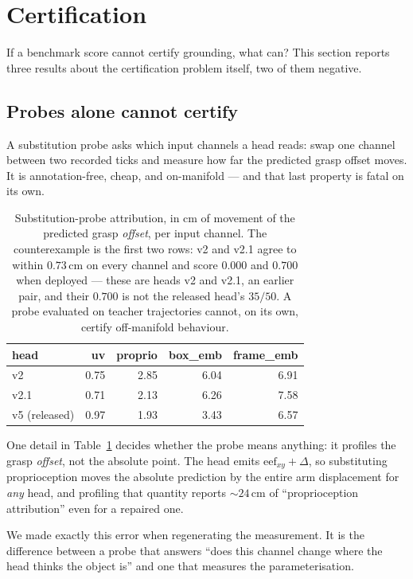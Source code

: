 \documentclass[10pt,twocolumn]{article}
\begin{document}
\section{Certification}
\label{sec:cert}

If a benchmark score cannot certify grounding, what can? This section reports
three results about the certification problem itself, two of them negative.

\subsection{Probes alone cannot certify}

A substitution probe asks which input channels a head reads: swap one channel
between two recorded ticks and measure how far the predicted grasp offset moves.
It is annotation-free, cheap, and on-manifold --- and that last property is
fatal on its own.



\begin{table}[h]\centering\small
\begin{tabular}{lrrrr}
\toprule
head & uv & proprio & box\_emb & frame\_emb \\
\midrule
v2 & 0.75 & 2.85 & 6.04 & 6.91 \\
v2.1 & 0.71 & 2.13 & 6.26 & 7.58 \\
v5 (released) & 0.97 & 1.93 & 3.43 & 6.57 \\
\bottomrule
\end{tabular}
\caption{Substitution-probe attribution, in cm of movement of the predicted
grasp \emph{offset}, per input channel. The counterexample is the first two
rows: v2 and v2.1 agree to within $0.73$\,cm on every channel and score
$0.000$ and $0.700$ when deployed --- these are heads v2 and v2.1, an
earlier pair, and their $0.700$ is not the released head's $35/50$.
A probe evaluated on teacher trajectories
cannot, on its own, certify off-manifold behaviour.}
\label{tab:probe}
\end{table}

\noindent One detail in Table~\ref{tab:probe} decides whether the probe means
anything: it profiles the grasp \emph{offset}, not the absolute point. The head
emits $\text{eef}_{xy} + \Delta$, so substituting proprioception moves the
absolute prediction by the entire arm displacement for \emph{any} head, and
profiling that quantity reports ${\sim}24$\,cm of ``proprioception
attribution'' even for a repaired one.

We made exactly this error when regenerating the measurement. It is the difference between a probe that answers ``does this channel
change where the head thinks the object is'' and one that measures the
parameterisation.
\end{document}
